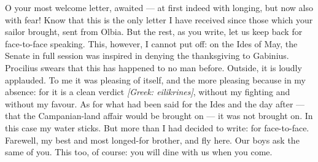 

 O your most welcome letter, awaited --- at first indeed with longing, but now also with fear! Know that this is the only letter I have received since those which your sailor brought, sent from Olbia. But the rest, as you write, let us keep back for face-to-face speaking. This, however, I cannot put off: on the Ides of May, the Senate in full session was inspired in denying the thanksgiving to Gabinius. Procilius swears that this has happened to no man before. Outside, it is loudly applauded. To me it was pleasing of itself, and the more pleasing because in my absence: for it is a clean verdict \textit{[Greek: eilikrines]}, without my fighting and without my favour. As for what had been said for the Ides and the day after --- that the Campanian-land affair would be brought on --- it was not brought on. In this case my water sticks. But more than I had decided to write: for face-to-face. Farewell, my best and most longed-for brother, and fly here. Our boys ask the same of you. This too, of course: you will dine with us when you come.
